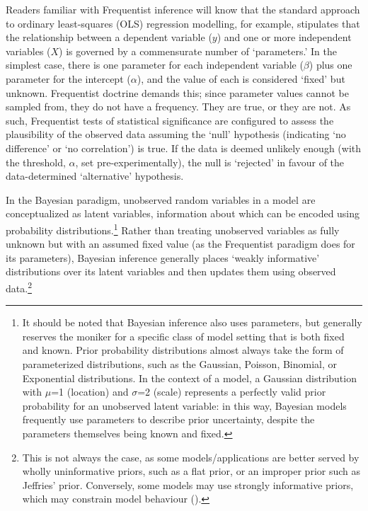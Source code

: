 \documentclass[
  12pt,
  a4paper,
  DIV=11,
  numbers=noendperiod,
  twoside,
  open=any]{scrartcl}
\begin{document}
Readers familiar with Frequentist inference will know that the standard
approach to ordinary least-squares (OLS) regression modelling, for
example, stipulates that the relationship between a dependent variable
(\(y\)) and one or more independent variables (\(X\)) is governed by a
commensurate number of `parameters.' In the simplest case, there is one
parameter for each independent variable (\(\beta\)) plus one parameter
for the intercept (\(\alpha\)), and the value of each is considered
`fixed' but unknown. Frequentist doctrine demands this; since parameter
values cannot be sampled from, they do not have a frequency. They are
true, or they are not. As such, Frequentist tests of statistical
significance are configured to assess the plausibility of the observed
data assuming the `null' hypothesis (indicating `no difference' or `no
correlation') is true. If the data is deemed unlikely enough (with the
threshold, \(\alpha\), set pre-experimentally), the null is `rejected'
in favour of the data-determined `alternative' hypothesis.

In the Bayesian paradigm, unobserved random variables in a model are
conceptualized as latent variables, information about which can be
encoded using probability distributions.\footnote{It should be noted
  that Bayesian inference also uses parameters, but generally reserves
  the moniker for a specific class of model setting that is both fixed
  and known. Prior probability distributions almost always take the form
  of parameterized distributions, such as the Gaussian, Poisson,
  Binomial, or Exponential distributions. In the context of a model, a
  Gaussian distribution with \(\mu\)=1 (location) and \(\sigma\)=2
  (scale) represents a perfectly valid prior probability for an
  unobserved latent variable: in this way, Bayesian models frequently
  use parameters to describe prior uncertainty, despite the parameters
  themselves being known and fixed.} Rather than treating unobserved
variables as fully unknown but with an assumed fixed value (as the
Frequentist paradigm does for its parameters), Bayesian inference
generally places `weakly informative' distributions over its latent
variables and then updates them using observed data.\footnote{This is
  not always the case, as some models/applications are better served by
  wholly uninformative priors, such as a flat prior, or an improper
  prior such as Jeffries' prior. Conversely, some models may use
  strongly informative priors, which may constrain model behaviour
  ().}
\end{document}
